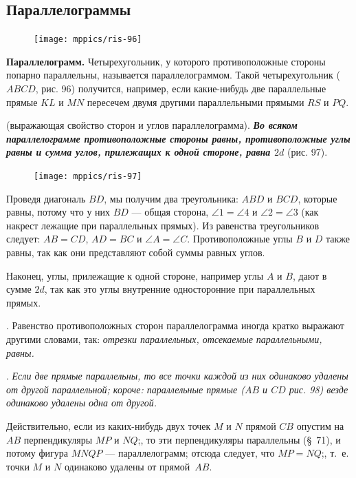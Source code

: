 \documentclass[oneside]{book}
\begin{document}
\subsection*{Параллелограммы}

\begin{figure}
\centering
\texttt{[image: mppics/ris-96]}
\caption{}
\end{figure}

\textbf{Параллелограмм.}
Четырехугольник, у которого противоположные стороны попарно параллельны, называется параллелограммом.
Такой четырехугольник ($ABCD$, рис. 96) получится, например, если какие-нибудь две параллельные прямые $KL$ и $MN$ пересечем двумя другими параллельными прямыми $RS$ и $PQ$.

 (выражающая свойство сторон и углов параллелограмма).
\textbf{\emph{Во всяком параллелограмме противоположные стороны равны, противоположные углы равны и сумма углов, прилежащих к одной стороне, равна $2d$}} (рис. 97).

\begin{figure}
\centering
\texttt{[image: mppics/ris-97]}
\caption{}
\end{figure}

Проведя диагональ $BD$, мы получим два треугольника:
$ABD$ и $BCD$, которые равны, потому что у них $BD$ — общая сторона, $\angle 1 = \angle 4$ и $\angle 2 = \angle 3$ (как накрест лежащие при параллельных прямых).
Из равенства треугольников следует:
$AB=CD$, $AD=BC$ и $\angle A = \angle C$.
Противоположные углы $B$ и $D$ также равны, так как они представляют собой суммы равных углов.

Наконец, углы, прилежащие к одной стороне, например углы $A$ и $B$, дают в сумме $2d$, так как это углы внутренние односторонние при параллельных прямых.

.
Равенство противоположных сторон параллелограмма иногда кратко выражают другими словами, так:
\emph{отрезки параллельных, отсекаемые параллельными, равны.}

.
\emph{Если две прямые параллельны, то все точки каждой из них одинаково удалены от другой параллельной;
короче:
параллельные прямые \emph{($AB$ и $CD$ рис. 98)} везде одинаково удалены одна от другой.}

Действительно, если из каких-нибудь двух точек $M$ и $N$ прямой $CB$ опустим на $AB$ перпендикуляры $MP$ и $NQ$;, то эти перпендикуляры параллельны (§~71), и потому фигура $MNQP$ — параллелограмм;
отсюда следует, что $MP=NQ$;, т.~е. точки $M$ и $N$ одинаково удалены от прямой~$AB$.
\end{document}
